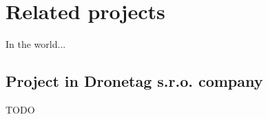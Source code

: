 \chapter{Related projects}\label{ch:related-projects}

In the world...

\section{Project in Dronetag s.r.o. company}\label{sec:project-in-dronetag-s.r.o.-company}
TODO